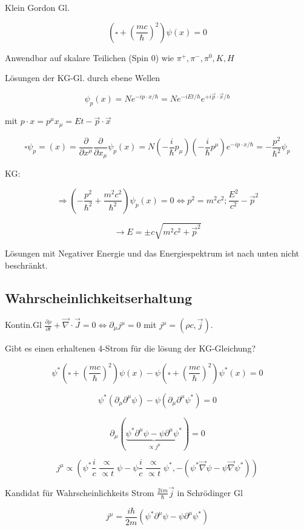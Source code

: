 Klein Gordon Gl.

\[(\square + (\frac{mc}{\hbar})^2)\psi(x) = 0\]

Anwendbar auf skalare Teilichen (Spin 0) wie \(\pi^+,\pi^-,\pi^0,K,H\)

Lösungen der KG-Gl. durch ebene Wellen

\[\psi_p(x) = N e^{-ip\cdot x/\hbar} = Ne^{-iEt/\hbar}e^{+i\vec p\cdot\vec x/\hbar}\]

mit \(p\cdot x = p^\mu x_\mu = Et-\vec p\cdot \vec x\)

\[\square \psi_p = (x) = \frac{\partial}{\partial x^\mu} \frac{\partial}{\partial x_\mu} \psi_p(x) = N(-\frac{i}{\hbar}p_\mu)(-\frac{i}{\hbar}p^\mu) e^{-ip\cdot x/\hbar} = -\frac{p^2}{\hbar^2}\psi_p \]


KG:

\[\Rightarrow (-\frac{p^2}{\hbar^2} + \frac{m^2c^2}{\hbar^2})\psi_p(x) = 0 \Leftrightarrow p^2 = m^2 c^2; \frac{E^2}{c^2}-\vec p^2\]

\[\rightarrow E = \pm c \sqrt{m^2c^2+\vec p^2}\]

Lösungen mit Negativer Energie und das Energiespektrum ist nach unten nicht beschränkt. 

\subsection{Wahrscheinlichkeitserhaltung}

Kontin.Gl \(\frac{\partial\rho}{\partial t}+\vec \nabla\cdot \vec J = 0 \Leftrightarrow \partial_\mu j^\mu = 0\) mit \(j^\mu = (\rho c,\vec j)\). 

Gibt es einen erhaltenen 4-Strom für die lösung der KG-Gleichung?

\[\psi^*(\square + (\frac{mc}{\hbar})^2)\psi(x) - \psi(\square + (\frac{mc}{\hbar})^2)\psi^*(x) = 0\]


\[\psi^*(\partial_\mu\partial^\mu \psi) - \psi(\partial_\mu\partial^\mu \psi^*) = 0 \]

\[\partial_\mu(\underbrace{\psi^*\partial^\mu\psi - \psi \partial^\mu \psi^*}_{\propto j^\mu}) = 0\]

\[ j^\mu \propto (\psi^*\frac{i}{c}\frac{\propto}{\propto t}\psi - \psi\frac{i}{c}\frac{\propto}{\propto t}\psi^* ,-(\psi^*\vec \nabla \psi - \psi\vec \nabla\psi^*)) \]

Kandidat für Wahrscheinlichkeits Strom \(\frac{2im}{\hbar}\vec j\) in Schrödinger Gl

\[j^\mu = \frac{i\hbar}{2m} (\psi^*\partial^\mu \psi - \psi \partial^\mu \psi^*)\]

